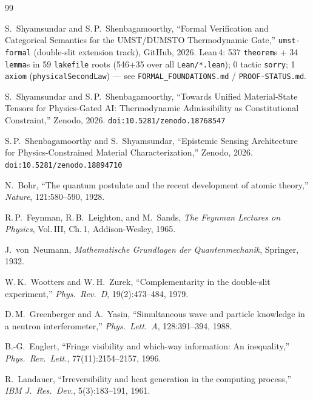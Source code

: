 \documentclass[11pt, a4paper]{article}
\begin{document}
\begingroup
\footnotesize
\begin{thebibliography}{99}

 S.~Shyamsundar and S.\,P.~Shenbagamoorthy, ``Formal Verification and Categorical Semantics for the UMST/DUMSTO Thermodynamic Gate,'' \texttt{umst-formal} (double-slit extension track), GitHub, 2026. Lean\,4: 537 \texttt{theorem}s + 34 \texttt{lemma}s in 59 \texttt{lakefile} roots (546+35 over all \texttt{Lean/*.lean}); 0 tactic \texttt{sorry}; 1 \texttt{axiom} (\texttt{physicalSecondLaw}) — see \texttt{FORMAL\_FOUNDATIONS.md} / \texttt{PROOF-STATUS.md}.

 S.~Shyamsundar and S.\,P.~Shenbagamoorthy, ``Towards Unified Material-State Tensors for Physics-Gated AI: Thermodynamic Admissibility as Constitutional Constraint,'' Zenodo, 2026. \texttt{doi:10.5281/zenodo.18768547}

 S.\,P.~Shenbagamoorthy and S.~Shyamsundar, ``Epistemic Sensing Architecture for Physics-Constrained Material Characterization,'' Zenodo, 2026. \texttt{doi:10.5281/zenodo.18894710}

 N.~Bohr, ``The quantum postulate and the recent development of atomic theory,'' \textit{Nature}, 121:580--590, 1928.

 R.\,P.~Feynman, R.\,B.~Leighton, and M.~Sands, \textit{The Feynman Lectures on Physics}, Vol.\,III, Ch.\,1, Addison-Wesley, 1965.

 J.~von~Neumann, \textit{Mathematische Grundlagen der Quantenmechanik}, Springer, 1932.

 W.\,K.~Wootters and W.\,H.~Zurek, ``Complementarity in the double-slit experiment,'' \textit{Phys.\ Rev.\ D}, 19(2):473--484, 1979.

 D.\,M.~Greenberger and A.~Yasin, ``Simultaneous wave and particle knowledge in a neutron interferometer,'' \textit{Phys.\ Lett.\ A}, 128:391--394, 1988.

 B.-G.~Englert, ``Fringe visibility and which-way information: An inequality,'' \textit{Phys.\ Rev.\ Lett.}, 77(11):2154--2157, 1996.

 R.~Landauer, ``Irreversibility and heat generation in the computing process,'' \textit{IBM J.\ Res.\ Dev.}, 5(3):183--191, 1961.


\end{thebibliography}
\end{document}
